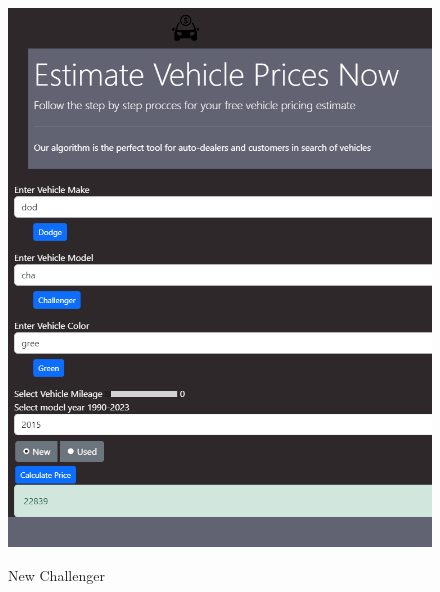 \documentclass[12pt]{article}
\begin{document}
\begin{figure}[H]
\caption{New Challenger}
\centering
\includegraphics[scale=.6]{figures/NewChallenger.png}\\
\end{figure}
\end{document}
